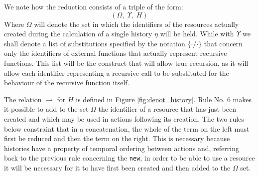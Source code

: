 We note how the reduction consists of a triple of the form:
\begin{equation}
    (\Omega, \;\Upsilon, \;H)
\end{equation}
Where $\Omega$ will denote the set in which the identifiers of the resources actually created during the calculation of a single history $\eta$ will be held. While with $\Upsilon$ we shall denote a list of substitutions specified by the notation $\{\cdot/\cdot\}$ that concern only the identifiers of external functions that actually represent recursive functions. This list will be the construct that will allow true recursion, as it will allow each identifier representing a recursive call to be substituted for the behaviour of the recursive function itself.

The relation $\rightarrow$ for $H$ is defined in Figure \ref{fig:denot_history}. Rule No. 6 makes it possible to add to the set $\Omega$ the identifier of a resource that has just been created and which may be used in actions following its creation. The two rules below constraint that in a concatenation, the whole of the term on the left must first be reduced and then the term on the right. This is necessary because histories have a property of temporal ordering between actions and, referring back to the previous rule concerning the \verb|new|, in order to be able to use a resource it will be necessary for it to have first been created and then added to the $\Omega$ set.

